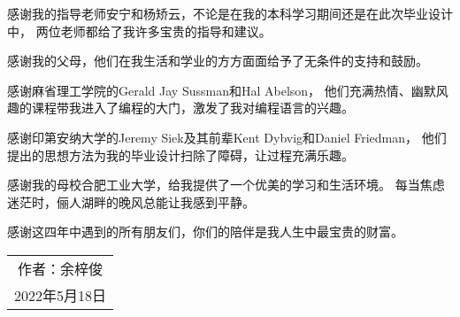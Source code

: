 
\begin{acknowledgements}

感谢我的指导老师安宁和杨矫云，不论是在我的本科学习期间还是在此次毕业设计中，
两位老师都给了我许多宝贵的指导和建议。

感谢我的父母，他们在我生活和学业的方方面面给予了无条件的支持和鼓励。

感谢麻省理工学院的Gerald Jay Sussman和Hal Abelson，
他们充满热情、幽默风趣的课程带我进入了编程的大门，激发了我对编程语言的兴趣。

感谢印第安纳大学的Jeremy Siek及其前辈Kent Dybvig和Daniel Friedman，
他们提出的思想方法为我的毕业设计扫除了障碍，让过程充满乐趣。

感谢我的母校合肥工业大学，给我提供了一个优美的学习和生活环境。
每当焦虑迷茫时，俪人湖畔的晚风总能让我感到平静。

感谢这四年中遇到的所有朋友们，你们的陪伴是我人生中最宝贵的财富。

\begin{flushright}
\begin{tabular}{ c }
作者：余梓俊 \\
2022年5月18日
\end{tabular}
\end{flushright}


\end{acknowledgements}
